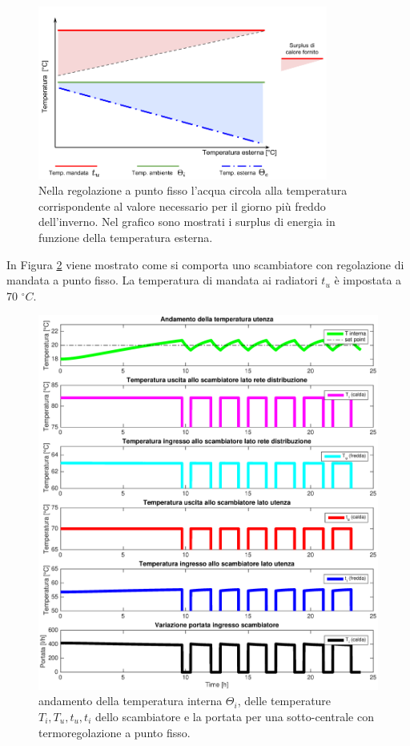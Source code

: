 \documentclass[laurea,oneside,11pt]{USiena_tesiLM}
\begin{document}
\begin{figure}[!ht]
\centering
\includegraphics[width=0.85\textwidth]{figure/surplus} 
\caption{Nella regolazione a punto fisso l'acqua circola alla temperatura corrispondente al valore necessario per il giorno più freddo dell'inverno. Nel grafico sono mostrati i surplus di energia in funzione della temperatura esterna.}
\label{fig:surplus}
\end{figure}

In Figura \ref{fig:reg_mandata} viene mostrato come si comporta uno scambiatore con regolazione di mandata a punto fisso. La temperatura di mandata ai radiatori $t_u$ è impostata a 70  $^{\circ}C$.  

\begin{figure}[!ht]
\centering
\includegraphics[width=\textwidth]{figure/reg_mandata} 
\caption{andamento della temperatura interna $\Theta_i$, delle temperature $T_i, T_u, t_u, t_i$ dello scambiatore e la portata per una sotto-centrale con termoregolazione a punto fisso.}
\label{fig:reg_mandata}
\end{figure}
\end{document}
